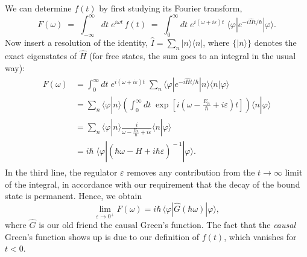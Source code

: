 \documentclass[pra,12pt]{revtex4}
\begin{document}
We can determine $f(t)$ by first studying its Fourier transform,
\begin{equation}
  F(\omega) \;=\; \int_{-\infty}^\infty dt \; e^{i\omega t}\, f(t) \;=\; \int_0^\infty dt \; e^{i(\omega + i\varepsilon) t} \; \langle\varphi|e^{-i\hat{H}t/\hbar}|\varphi\rangle.
\end{equation}
Now insert a resolution of the identity, $\hat{I} = \sum_n
|n\rangle\langle n|$, where $\{|n\rangle\}$ denotes the exact
eigenstates of $\hat{H}$ (for free states, the sum goes to an integral
in the usual way):
\begin{align}
  \begin{aligned}F(\omega) &= \int_0^\infty dt \; e^{i(\omega + i\varepsilon) t} \; \sum_n \langle\varphi|e^{-i\hat{H}t/\hbar}|n\rangle\langle n|\varphi\rangle \\ &= \sum_n \langle\varphi|n\rangle \left( \int_0^\infty dt \; \exp\left[i\left(\omega - \frac{E_n}{\hbar} + i\varepsilon\right) t\right] \right) \langle n|\varphi\rangle \\ &= \sum_n \langle\varphi|n\rangle \frac{i}{\omega - \frac{E_n}{\hbar} + i \varepsilon} \langle n|\varphi\rangle \\ &= i \hbar\; \langle \varphi | \left(\hbar\omega - \hat{H} + i\hbar\varepsilon \right)^{\!-1} | \varphi\rangle. \end{aligned}
\end{align}
In the third line, the regulator $\varepsilon$ removes any
contribution from the $t \rightarrow\infty$ limit of the integral, in
accordance with our requirement that the decay of the bound state is
permanent.  Hence, we obtain
\begin{equation}
  \lim_{\varepsilon \rightarrow 0^+} F(\omega) = i \hbar \, \langle \varphi | \hat{G}(\hbar\omega) | \varphi\rangle,
\end{equation}
where $\hat{G}$ is our old friend the causal Green's function.  The
fact that the \textit{causal} Green's function shows up is due to our
definition of $f(t)$, which vanishes for $t < 0$.
\end{document}
